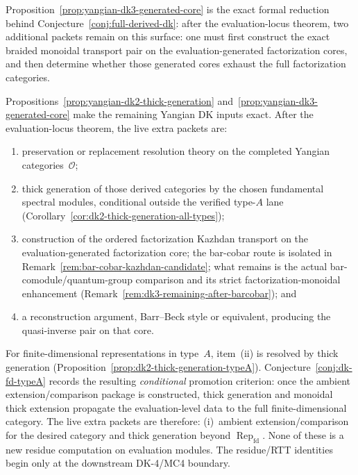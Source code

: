 \begin{remark}
\label{rem:yangian-dk3-generated-core-application}
Proposition~\ref{prop:yangian-dk3-generated-core} is the exact formal
reduction behind Conjecture~\ref{conj:full-derived-dk}: after the
evaluation-locus theorem, two additional packets remain on this
surface: one must first construct the exact braided monoidal
transport pair on the evaluation-generated factorization cores, and
then determine whether those generated cores exhaust the full
factorization categories.
\end{remark}

\begin{remark}
\label{rem:yangian-dk23-inputs}
Propositions~\ref{prop:yangian-dk2-thick-generation}
and~\ref{prop:yangian-dk3-generated-core} make the remaining Yangian
DK inputs exact. After the evaluation-locus theorem, the live extra
packets are:
\begin{enumerate}[label=\textup{(\roman*)}]
\item preservation or replacement resolution theory on the completed
 Yangian categories~$\mathcal{O}$;
\item thick generation of those derived categories by the chosen
 fundamental spectral modules, conditional outside the verified
 type-$A$ lane
 (Corollary~\ref{cor:dk2-thick-generation-all-types});
\item construction of the ordered factorization Kazhdan transport on
 the evaluation-generated factorization core; the bar-cobar route is
 isolated in Remark~\ref{rem:bar-cobar-kazhdan-candidate};
 what remains is the actual bar-comodule/quantum-group comparison and
 its strict factorization-monoidal enhancement
 (Remark~\ref{rem:dk3-remaining-after-barcobar}); and
\item a reconstruction argument, Barr--Beck style or equivalent,
 producing the quasi-inverse pair on that core.
\end{enumerate}
For finite-dimensional representations in type~$A$,
item~(ii) is resolved by thick generation
\textup{(}Proposition~\ref{prop:dk2-thick-generation-typeA}\textup{)}.
Conjecture~\ref{conj:dk-fd-typeA} records the resulting \emph{conditional}
promotion criterion: once the ambient extension/comparison package is
constructed, thick generation and monoidal thick extension propagate
the evaluation-level data to the full finite-dimensional category.
The live extra packets are therefore:
(i)~ambient extension/comparison for the desired category and
thick generation beyond $\operatorname{Rep}_{\mathrm{fd}}$.
None of these is a new residue computation on evaluation modules. The
residue/RTT identities begin only at the downstream DK-4/MC4 boundary.
\end{remark}

